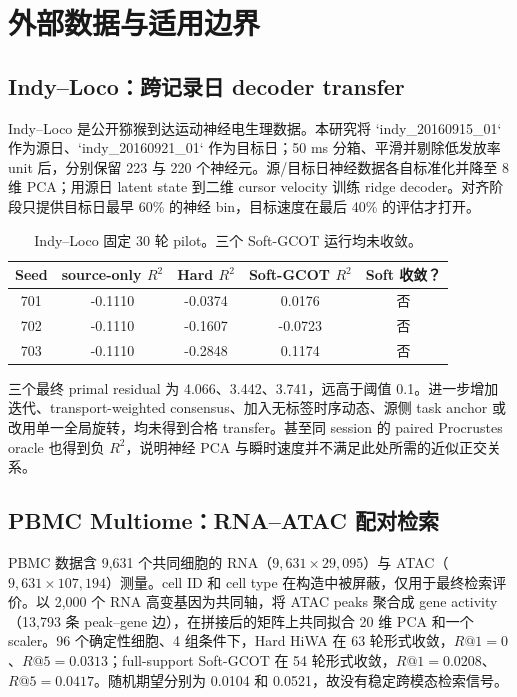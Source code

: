 \documentclass[UTF8,a4paper,11pt]{ctexart}
\begin{document}
\section{外部数据与适用边界}
\subsection{Indy--Loco：跨记录日 decoder transfer}
Indy--Loco 是公开猕猴到达运动神经电生理数据。本研究将 `indy\_20160915\_01` 作为源日、`indy\_20160921\_01` 作为目标日；50 ms 分箱、平滑并剔除低发放率 unit 后，分别保留 223 与 220 个神经元。源/目标日神经数据各自标准化并降至 8 维 PCA；用源日 latent state 到二维 cursor velocity 训练 ridge decoder。对齐阶段只提供目标日最早 60\% 的神经 bin，目标速度在最后 40\% 的评估才打开。

\begin{table}[H]
\centering
\caption{Indy--Loco 固定 30 轮 pilot。三个 Soft-GCOT 运行均未收敛。}
\begin{tabular}{ccccc}
\toprule
Seed & source-only $R^2$ & Hard $R^2$ & Soft-GCOT $R^2$ & Soft 收敛？\\
\midrule
701 & -0.1110 & -0.0374 & 0.0176 & 否\\
702 & -0.1110 & -0.1607 & -0.0723 & 否\\
703 & -0.1110 & -0.2848 & 0.1174 & 否\\
\bottomrule
\end{tabular}
\end{table}
三个最终 primal residual 为 4.066、3.442、3.741，远高于阈值 0.1。进一步增加迭代、transport-weighted consensus、加入无标签时序动态、源侧 task anchor 或改用单一全局旋转，均未得到合格 transfer。甚至同 session 的 paired Procrustes oracle 也得到负 $R^2$，说明神经 PCA 与瞬时速度并不满足此处所需的近似正交关系。

\subsection{PBMC Multiome：RNA--ATAC 配对检索}
PBMC 数据含 9,631 个共同细胞的 RNA（$9{,}631\times29{,}095$）与 ATAC（$9{,}631\times107{,}194$）测量。cell ID 和 cell type 在构造中被屏蔽，仅用于最终检索评价。以 2,000 个 RNA 高变基因为共同轴，将 ATAC peaks 聚合成 gene activity（13,793 条 peak--gene 边），在拼接后的矩阵上共同拟合 20 维 PCA 和一个 scaler。96 个确定性细胞、4 组条件下，Hard HiWA 在 63 轮形式收敛，$R@1=0$、$R@5=0.0313$；full-support Soft-GCOT 在 54 轮形式收敛，$R@1=0.0208$、$R@5=0.0417$。随机期望分别为 0.0104 和 0.0521，故没有稳定跨模态检索信号。
\end{document}
